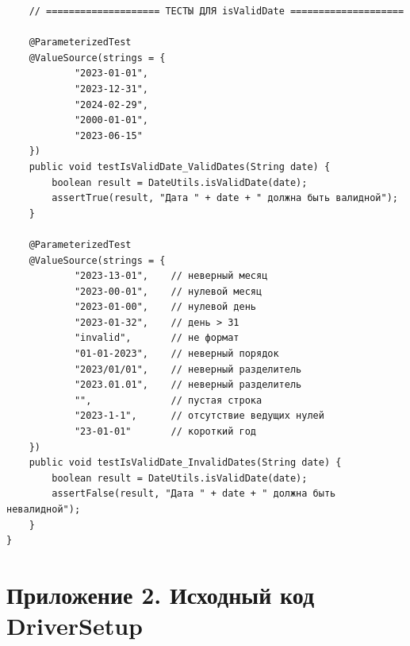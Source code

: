 \documentclass{article}[14pt]
\begin{document}
\begin{lstlisting}
    // ==================== ТЕСТЫ ДЛЯ isValidDate ====================

    @ParameterizedTest
    @ValueSource(strings = {
            "2023-01-01",
            "2023-12-31",
            "2024-02-29",
            "2000-01-01",
            "2023-06-15"
    })
    public void testIsValidDate_ValidDates(String date) {
        boolean result = DateUtils.isValidDate(date);
        assertTrue(result, "Дата " + date + " должна быть валидной");
    }

    @ParameterizedTest
    @ValueSource(strings = {
            "2023-13-01",    // неверный месяц
            "2023-00-01",    // нулевой месяц
            "2023-01-00",    // нулевой день
            "2023-01-32",    // день > 31
            "invalid",       // не формат
            "01-01-2023",    // неверный порядок
            "2023/01/01",    // неверный разделитель
            "2023.01.01",    // неверный разделитель
            "",              // пустая строка
            "2023-1-1",      // отсутствие ведущих нулей
            "23-01-01"       // короткий год
    })
    public void testIsValidDate_InvalidDates(String date) {
        boolean result = DateUtils.isValidDate(date);
        assertFalse(result, "Дата " + date + " должна быть невалидной");
    }
}
\end{lstlisting}

\pagebreak

\section*{Приложение 2. Исходный код DriverSetup}
\end{document}
